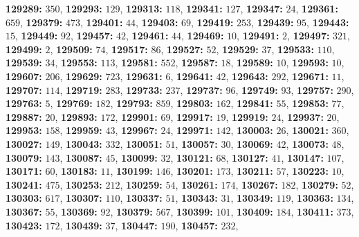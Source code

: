 \textsf{\bfseries 129289:} $350$, \textsf{\bfseries 129293:} $129$, \textsf{\bfseries 129313:} $118$, \textsf{\bfseries 129341:} $127$, \textsf{\bfseries 129347:} $24$, \textsf{\bfseries 129361:} $659$, \textsf{\bfseries 129379:} $473$, \textsf{\bfseries 129401:} $44$, \textsf{\bfseries 129403:} $69$, \textsf{\bfseries 129419:} $253$, \textsf{\bfseries 129439:} $95$, \textsf{\bfseries 129443:} $15$, \textsf{\bfseries 129449:} $92$, \textsf{\bfseries 129457:} $42$, \textsf{\bfseries 129461:} $44$, \textsf{\bfseries 129469:} $10$, \textsf{\bfseries 129491:} $2$, \textsf{\bfseries 129497:} $321$, \textsf{\bfseries 129499:} $2$, \textsf{\bfseries 129509:} $74$, \textsf{\bfseries 129517:} $86$, \textsf{\bfseries 129527:} $52$, \textsf{\bfseries 129529:} $37$, \textsf{\bfseries 129533:} $110$, \textsf{\bfseries 129539:} $34$, \textsf{\bfseries 129553:} $113$, \textsf{\bfseries 129581:} $552$, \textsf{\bfseries 129587:} $18$, \textsf{\bfseries 129589:} $10$, \textsf{\bfseries 129593:} $10$, \textsf{\bfseries 129607:} $206$, \textsf{\bfseries 129629:} $723$, \textsf{\bfseries 129631:} $6$, \textsf{\bfseries 129641:} $42$, \textsf{\bfseries 129643:} $292$, \textsf{\bfseries 129671:} $11$, \textsf{\bfseries 129707:} $114$, \textsf{\bfseries 129719:} $283$, \textsf{\bfseries 129733:} $237$, \textsf{\bfseries 129737:} $96$, \textsf{\bfseries 129749:} $93$, \textsf{\bfseries 129757:} $290$, \textsf{\bfseries 129763:} $5$, \textsf{\bfseries 129769:} $182$, \textsf{\bfseries 129793:} $859$, \textsf{\bfseries 129803:} $162$, \textsf{\bfseries 129841:} $55$, \textsf{\bfseries 129853:} $77$, \textsf{\bfseries 129887:} $20$, \textsf{\bfseries 129893:} $172$, \textsf{\bfseries 129901:} $69$, \textsf{\bfseries 129917:} $19$, \textsf{\bfseries 129919:} $24$, \textsf{\bfseries 129937:} $20$, \textsf{\bfseries 129953:} $158$, \textsf{\bfseries 129959:} $43$, \textsf{\bfseries 129967:} $24$, \textsf{\bfseries 129971:} $142$, \textsf{\bfseries 130003:} $26$, \textsf{\bfseries 130021:} $360$, \textsf{\bfseries 130027:} $149$, \textsf{\bfseries 130043:} $332$, \textsf{\bfseries 130051:} $51$, \textsf{\bfseries 130057:} $30$, \textsf{\bfseries 130069:} $42$, \textsf{\bfseries 130073:} $48$, \textsf{\bfseries 130079:} $143$, \textsf{\bfseries 130087:} $45$, \textsf{\bfseries 130099:} $32$, \textsf{\bfseries 130121:} $68$, \textsf{\bfseries 130127:} $41$, \textsf{\bfseries 130147:} $107$, \textsf{\bfseries 130171:} $60$, \textsf{\bfseries 130183:} $11$, \textsf{\bfseries 130199:} $146$, \textsf{\bfseries 130201:} $173$, \textsf{\bfseries 130211:} $57$, \textsf{\bfseries 130223:} $10$, \textsf{\bfseries 130241:} $475$, \textsf{\bfseries 130253:} $212$, \textsf{\bfseries 130259:} $54$, \textsf{\bfseries 130261:} $174$, \textsf{\bfseries 130267:} $182$, \textsf{\bfseries 130279:} $52$, \textsf{\bfseries 130303:} $617$, \textsf{\bfseries 130307:} $110$, \textsf{\bfseries 130337:} $51$, \textsf{\bfseries 130343:} $31$, \textsf{\bfseries 130349:} $119$, \textsf{\bfseries 130363:} $134$, \textsf{\bfseries 130367:} $55$, \textsf{\bfseries 130369:} $92$, \textsf{\bfseries 130379:} $567$, \textsf{\bfseries 130399:} $101$, \textsf{\bfseries 130409:} $184$, \textsf{\bfseries 130411:} $373$, \textsf{\bfseries 130423:} $172$, \textsf{\bfseries 130439:} $37$, \textsf{\bfseries 130447:} $190$, \textsf{\bfseries 130457:} $232$, 
